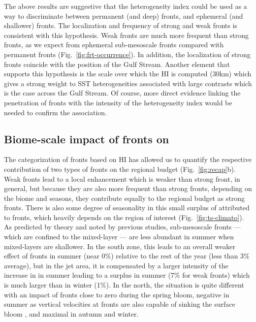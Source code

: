 The above results are suggestive that the heterogeneity index could be used as a way to discriminate between permanent (and deep) fronts, and ephemeral (and shallower) fronts.
The localization and frequency of strong and weak fronts is consistent with this hypothesis.
Weak fronts are much more frequent than strong fronts, as we expect from ephemeral sub-mesoscale fronts compared with permanent fronts (Fig.~\ref{fig:frt-occurrence}).
In addition, the localization of strong fronts coincide with the position of the Gulf Stream.
Another element that supports this hypothesis is the scale over which the HI is computed (30km) which gives a strong weight to SST heterogeneities associated with large contrasts which is the case across the Gulf Stream.
Of course, more direct evidence linking the penetration of fronts with the intensity of the heterogeneity index would be needed to confirm the association.

\subsection{Biome-scale impact of fronts on }

The categorization of fronts based on HI has allowed us to quantify the respective contribution of two types of fronts on the regional  budget (Fig.~\ref{fig:recap}b).
Weak fronts lead to a local  enhancement which is weaker than strong front, in general, but because they are also more frequent than strong fronts, depending on the biome and seasons, they contribute equally to the regional  budget as strong fronts.
There is also some degree of seasonality in this small surplus of  attributed to fronts, which heavily depends on the region of interest (Fig.~\ref{fig:ts-climato}).
As predicted by theory and noted by previous studies, sub-mesoscale fronts --- which are confined to the mixed-layer --- are less abundant in summer when mixed-layers are shallower.
In the south zone, this leads to an overall weaker effect of fronts in summer (near 0\%) relative to the rest of the year (less than 3\% average), but in the jet area, it is compensated by a larger intensity of the increase in  in summer leading to a  surplus in summer (7\% for weak fronts) which is much larger than in winter (1\%).
In the north, the situation is quite different with an impact of fronts close to zero during the spring bloom, negative in summer as vertical velocities at fronts are also capable of sinking the surface bloom \citep{levy_2018}, and maximal in autumn and winter.

